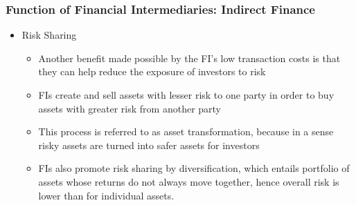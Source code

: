 \documentclass{beamer}
\begin{document}

\begin{frame}
\frametitle{Function of Financial Intermediaries: Indirect Finance }
\begin{itemize}
\item Risk Sharing

\begin{itemize}
\item  Another benefit made possible by the FI's low transaction costs is that they can help reduce the exposure of investors to risk
\item FIs create and sell assets with lesser risk to one party in order to buy assets with greater risk from another party
\item This process is referred to as asset transformation, because in a sense risky assets are turned into safer assets for investors
\item FIs also promote risk sharing by diversification, which entails portfolio of assets whose returns do not always move together, hence overall risk is lower than for individual assets.
\end{itemize}

\end{itemize}

\end{frame}

\end{document}
